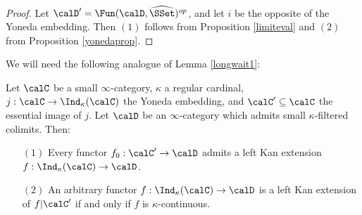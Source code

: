\begin{proof}
Let $\calD' = \Fun( \calD, \widehat{\SSet})^{op}$, and let $i$
be the opposite of the Yoneda embedding. Then $(1)$ follows from Proposition \ref{limiteval} and $(2)$ from Proposition \ref{yonedaprop}.
\end{proof}

We will need the following analogue of Lemma \ref{longwait1}:

\begin{lemma}\label{waitlong1}
Let $\calC$ be a small $\infty$-category, $\kappa$ a regular cardinal,  
$j: \calC \rightarrow \Ind_{\kappa}(\calC)$ the Yoneda embedding, and $\calC' \subseteq \calC$ the essential image of $j$. Let $\calD$ be an $\infty$-category which admits small $\kappa$-filtered colimits. Then:
\begin{itemize}
\item[$(1)$] Every functor $f_0: \calC' \rightarrow \calD$ admits a left Kan extension
$f: \Ind_{\kappa}(\calC) \rightarrow \calD$.

\item[$(2)$] An arbitrary functor $f: \Ind_{\kappa}(\calC) \rightarrow \calD$ is a left Kan extension of $f| \calC'$ if and only if $f$ is $\kappa$-continuous.

\end{itemize}
\end{lemma}

